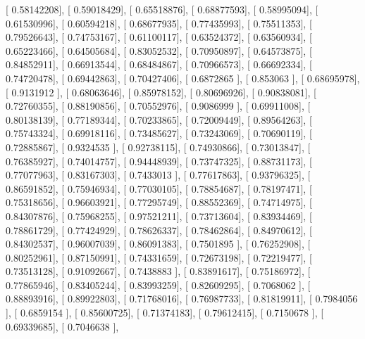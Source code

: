 \documentclass{article}
\begin{document}
       [ 0.58142208],
       [ 0.59018429],
       [ 0.65518876],
       [ 0.68877593],
       [ 0.58995094],
       [ 0.61530996],
       [ 0.60594218],
       [ 0.68677935],
       [ 0.77435993],
       [ 0.75511353],
       [ 0.79526643],
       [ 0.74753167],
       [ 0.61100117],
       [ 0.63524372],
       [ 0.63560934],
       [ 0.65223466],
       [ 0.64505684],
       [ 0.83052532],
       [ 0.70950897],
       [ 0.64573875],
       [ 0.84852911],
       [ 0.66913544],
       [ 0.68484867],
       [ 0.70966573],
       [ 0.66692334],
       [ 0.74720478],
       [ 0.69442863],
       [ 0.70427406],
       [ 0.6872865 ],
       [ 0.853063  ],
       [ 0.68695978],
       [ 0.9131912 ],
       [ 0.68063646],
       [ 0.85978152],
       [ 0.80696926],
       [ 0.90838081],
       [ 0.72760355],
       [ 0.88190856],
       [ 0.70552976],
       [ 0.9086999 ],
       [ 0.69911008],
       [ 0.80138139],
       [ 0.77189344],
       [ 0.70233865],
       [ 0.72009449],
       [ 0.89564263],
       [ 0.75743324],
       [ 0.69918116],
       [ 0.73485627],
       [ 0.73243069],
       [ 0.70690119],
       [ 0.72885867],
       [ 0.9324535 ],
       [ 0.92738115],
       [ 0.74930866],
       [ 0.73013847],
       [ 0.76385927],
       [ 0.74014757],
       [ 0.94448939],
       [ 0.73747325],
       [ 0.88731173],
       [ 0.77077963],
       [ 0.83167303],
       [ 0.7433013 ],
       [ 0.77617863],
       [ 0.93796325],
       [ 0.86591852],
       [ 0.75946934],
       [ 0.77030105],
       [ 0.78854687],
       [ 0.78197471],
       [ 0.75318656],
       [ 0.96603921],
       [ 0.77295749],
       [ 0.88552369],
       [ 0.74714975],
       [ 0.84307876],
       [ 0.75968255],
       [ 0.97521211],
       [ 0.73713604],
       [ 0.83934469],
       [ 0.78861729],
       [ 0.77424929],
       [ 0.78626337],
       [ 0.78462864],
       [ 0.84970612],
       [ 0.84302537],
       [ 0.96007039],
       [ 0.86091383],
       [ 0.7501895 ],
       [ 0.76252908],
       [ 0.80252961],
       [ 0.87150991],
       [ 0.74331659],
       [ 0.72673198],
       [ 0.72219477],
       [ 0.73513128],
       [ 0.91092667],
       [ 0.7438883 ],
       [ 0.83891617],
       [ 0.75186972],
       [ 0.77865946],
       [ 0.83405244],
       [ 0.83993259],
       [ 0.82609295],
       [ 0.7068062 ],
       [ 0.88893916],
       [ 0.89922803],
       [ 0.71768016],
       [ 0.76987733],
       [ 0.81819911],
       [ 0.7984056 ],
       [ 0.6859154 ],
       [ 0.85600725],
       [ 0.71374183],
       [ 0.79612415],
       [ 0.7150678 ],
       [ 0.69339685],
       [ 0.7046638 ],
\end{document}
